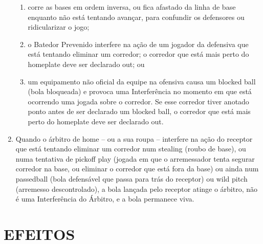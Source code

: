 \begin{enumerate}[label=(\alph*)]
\begin{enumerate}[label=\roman*.]
	\item corre as bases em ordem inversa, ou fica afastado da linha de base enquanto não está tentando avançar, para confundir os
	 defensores ou ridicularizar o jogo;
	\item o Batedor Prevenido interfere na ação de um jogador da defensiva que
	 está tentando eliminar um corredor; o corredor que está mais perto do \gls{homeplate} deve ser declarado \gls{out}; ou
	\item um equipamento não oficial da equipe na ofensiva causa um \gls{blocked ball} (bola bloqueada) e provoca uma Interferência no momento em que está ocorrendo uma jogada sobre o corredor. Se esse corredor tiver anotado ponto antes de ser declarado um \gls{blocked ball}, o corredor que está mais perto do \gls{homeplate} deve ser declarado \gls{out}.
	\end{enumerate}
	\item  Quando o árbitro de \gls{home} -- ou a sua roupa -- interfere na ação do receptor que está tentando eliminar um corredor num \gls{stealing} (roubo de base),  ou numa tentativa de \gls{pickoff play} (jogada em que o arremessador tenta segurar  corredor na base, ou eliminar o corredor que está fora da base) ou ainda num \gls{passedball} (bola defensável que passa para trás do receptor) ou \gls{wild pitch}  (arremesso descontrolado), a bola lançada pelo receptor atinge o árbitro, não é  uma Interferência do Árbitro, e a bola permanece viva.
\end{enumerate}

\section*{EFEITOS}

